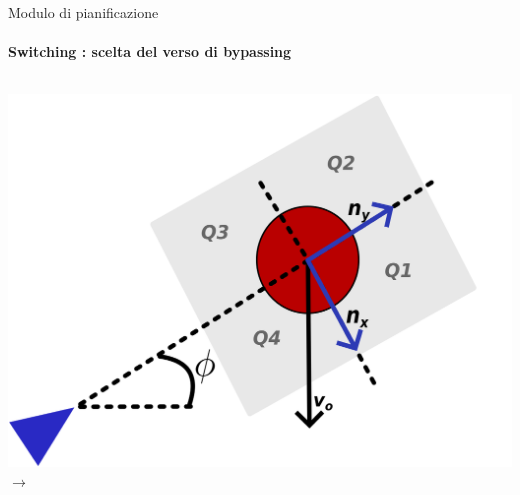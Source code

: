 \documentclass[handout]{beamer}
\begin{document}
\begin{frame}{Modulo di pianificazione}
\framesubtitle{Switching : scelta del verso di bypassing}
\begin{columns}
\centering
\includegraphics{sceltaverso.png}
\centering
$\rightarrow$
\centering

\end{columns}
\end{frame}
\end{document}
